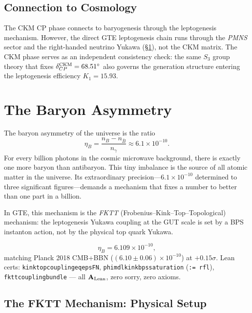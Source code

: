 \documentclass[11pt,openany]{book}
\theoremstyle{remark}
\newcommand{\lean}[1]{%
  \penalty-100
  \begingroup\def\_{\textunderscore\allowbreak}\texttt{#1}\endgroup}
\newcommand{\CatAL}{\ensuremath{\textbf{A}_{\rm Lean}}}
\begin{document}
\subsection*{Connection to Cosmology}

The CKM CP phase connects to baryogenesis through the leptogenesis mechanism.
However, the direct GTE leptogenesis chain runs through the \emph{PMNS} sector
and the right-handed neutrino Yukawa (§\ref{sec:baryons}), not the CKM matrix.
The CKM phase serves as an independent consistency check: the same $S_3$ group theory
that fixes $\delta_{CP}^{\rm CKM} = 68.51^\circ$ \cite{SpivackCKM} also governs the generation structure
entering the leptogenesis efficiency $K_1 = 15.93$.

\section{The Baryon Asymmetry}
\label{sec:baryons}

The baryon asymmetry of the universe is the ratio
\[
  \eta_B
  = \frac{n_B - n_{\bar B}}{n_\gamma}
  \approx 6.1 \times 10^{-10}.
\]
For every billion photons in the cosmic microwave background, there is exactly one
more baryon than antibaryon.
This tiny imbalance is the source of all atomic matter in the universe.
Its extraordinary precision---$6.1 \times 10^{-10}$ determined to three significant
figures---demands a mechanism that fixes a number to better than one part in a billion.

In GTE, this mechanism is the \emph{FKTT} (Frobenius--Kink--Top--Topological)
mechanism: the leptogenesis Yukawa coupling at the GUT scale is set by a BPS instanton
action, not by the physical top quark Yukawa.

\begin{tcolorbox}[colback=orange!5,colframe=orange!60,
  title={Result: Baryon Asymmetry via FKTT (\CatAL)}]
  \[
    \eta_B = 6.109 \times 10^{-10},
  \]
  matching Planck 2018 CMB+BBN ($(6.10 \pm 0.06) \times 10^{-10}$) at $+0.15\sigma$.
  Lean certs: \lean{kink\_top\_coupling\_eq\_eps\_FN},
  \lean{phi\_mdl\_kink\_bps\_saturation} (\texttt{:= rfl}),
  \lean{fktt\_coupling\_bundle} --- all \CatAL, zero sorry, zero axioms.
\end{tcolorbox}

\subsection*{The FKTT Mechanism: Physical Setup}
\end{document}
